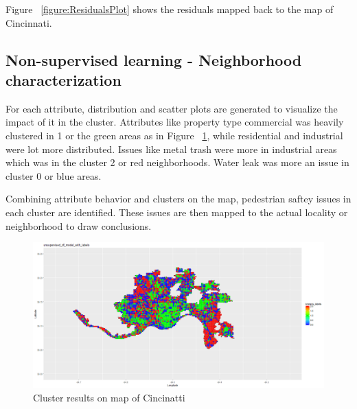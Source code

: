 \documentclass{llncs}
\begin{document}
Figure ~\ref{figure:ResidualsPlot} shows the residuals mapped back to the map of Cincinnati.

\subsection{Non-supervised learning - Neighborhood characterization}

For each attribute, distribution and scatter plots are generated to visualize the impact of it in the cluster. Attributes like property type commercial was heavily clustered in 1 or the green areas as in Figure ~\ref{figure:kmeansongrid}, while residential and industrial were lot more distributed. Issues like metal trash were more in industrial areas which was in the cluster 2 or red neighborhoods. Water leak was more an issue in cluster 0 or blue areas.

Combining attribute behavior and clusters on the map, pedestrian saftey issues in each cluster are identified. These issues are then mapped to the actual locality or neighborhood to draw conclusions.

\FloatBarrier
\begin{figure}
 	\includegraphics[width=\textwidth, height=\textheight, keepaspectratio]{kmeansongrid.png}
 	\caption{Cluster results on map of Cincinatti}
	\label{figure:kmeansongrid}
\end{figure}
\FloatBarrier
\end{document}
